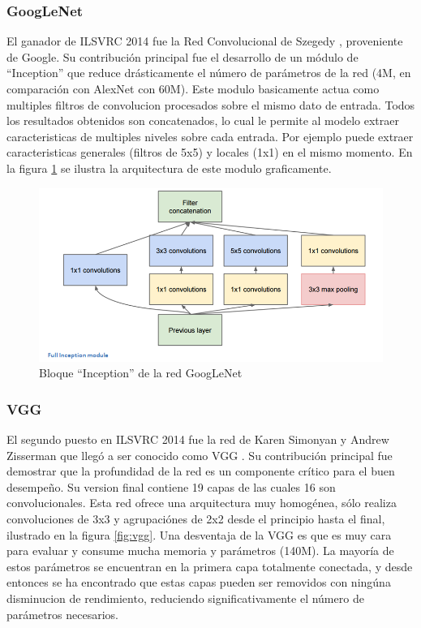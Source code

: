\documentclass[a4paper,11pt,spanish]{book}
\begin{document}
	\subsubsection{GoogLeNet}
	  El ganador de ILSVRC 2014 fue la Red Convolucional de Szegedy \cite{Szegedy:Convolutions}, proveniente de Google. Su contribución principal fue el desarrollo de un 
	  módulo de ``Inception'' que reduce drásticamente el número de parámetros de la red (4M, en comparación con AlexNet con 60M). 
	  Este modulo basicamente actua como multiples filtros de convolucion
	  procesados sobre el mismo dato de entrada. Todos los resultados obtenidos son concatenados, lo cual le permite al modelo extraer caracteristicas de multiples niveles sobre
	  cada entrada. Por ejemplo puede extraer caracteristicas generales (filtros de 5x5) y locales (1x1) en el mismo momento. En la figura \ref{fig:inception} se ilustra la arquitectura
	  de este modulo graficamente.

	  \begin{figure}[h]
	    \begin{center}
	    \includegraphics[width=0.6\linewidth]{./img/googlenet_inception_module.png}
	    \end{center}
	    \caption{Bloque ``Inception'' de la red GoogLeNet}
	    \label{fig:inception}
	  \end{figure}	  

	\subsubsection{VGG}
	  El segundo puesto en ILSVRC 2014 fue la red de Karen Simonyan y Andrew Zisserman que llegó a ser conocido como VGG \cite{SimonyanVGG}. 
	  Su contribución principal fue demostrar que la profundidad de
	  la red es un componente crítico para el buen desempeño. Su version final contiene 19 capas de las cuales 16 son convolucionales. Esta red ofrece una arquitectura 
	  muy homogénea, sólo realiza convoluciones de 3x3 y agrupaciónes de 2x2 desde el principio hasta el final, ilustrado en la figura \ref{fig:vgg}.
	  Una desventaja de la VGG es que es muy cara para evaluar y consume mucha memoria y parámetros (140M). La mayoría de estos parámetros se encuentran en la primera
	  capa totalmente conectada, y desde entonces se ha encontrado que estas capas pueden ser removidos con ningúna disminucion de rendimiento, reduciendo significativamente el
	  número de parámetros necesarios.
	  
\end{document}
